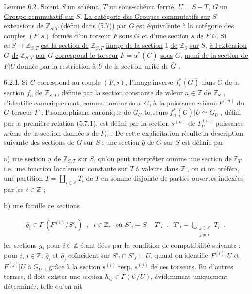 \underline{Lemme} 6.2. \underline{Soient} $S$ \underline{un schéma}, $T$ \underline{un sous-schéma fermé}, $U = S-T$, $G$ \underline{un Groupe commutatif sur} $S$. \underline{La catégorie des Groupes commutatifs sur} $S$ \underline{extensions de} $\mathbb{Z}_{S,T}$ (\underline{défini dans} (5.7)) \underline{par} $G$ \underline{est équivalente à la catégorie des couples} $(F,s)$ \underline{formés d'un torseur} $F$ \underline{sous} $G$ \underline{et d'une section} $s$ \underline{de} $F|U$. \underline{Si} $\alpha : S \longrightarrow \mathbb{Z}_{S,T}$ \underline{est la section de} $\mathbb{Z}_{S,T}$ \underline{image de la section} $1$ \underline{de} $\mathbb{Z}_S$ \underline{sur} $S$, \underline{à l'extension} $\overline{G}$ \underline{de} $\mathbb{Z}_{S,T}$ \underline{par} $G$ \underline{correspond le torseur} $F = \alpha^*(\overline{G})$ \underline{sous} $G$, \underline{muni de la section de} $F|U$ \underline{donnée par la restriction à} $U$ \underline{de la section unité de} $\overline{G}$ .



6.2.1. Si $\overline{G}$ correspond au couple $(F,s)$, l'image inverse $f^*_n(\overline{G})$ dans $\overline{G}$ de la section $f_n$ de $\mathbb{Z}_{S,T}$, définie par la section constante de valeur $n \in \mathbb{Z}$ de $\mathbb{Z}_S$ , s'identifie canoniquement, comme torseur sous $G$, à la puissance $n$.ième $F^{(n)}$ du $G$-torseur $F$ ; l'isomorphisme canonique de $G_U$-torseurs $f^*_n(\overline{G})|U \simeq G_U$ , défini par la première relation (5.7.1), est défini par la section $s^{(n)}$ de $F^{(n)}_U$ puissance $n$.ème de la section donnée $s$ de $F_U$ . De cette explicitation résulte la description suivante des sections de $\overline{G}$ sur $S$ : une section $\overline{g}$ de $\overline{G}$ sur $S$ est définie par

a) une section $\underline{n}$ de $\mathbb{Z}_{S,T}$ sur $S$, qu'on peut interpréter comme une section de $\mathbb{Z}_T$ i.e. une fonction localement constante sur $T$ à valeurs dans $\mathbb{Z}$ , ou si on préfère, une partition $T = \coprod\limits_{i \in \mathbb{Z}} T_i$ de $T$ en somme disjointe de parties ouvertes indexées par les $i \in \mathbb{Z}$ ;

b) une famille de sections

\begin{multline*}
\overline{g}_i \in \Gamma\,(F^{(i)}/S'_i) \;\;,\;\; i \in \mathbb{Z},\;\; \text{où } S'_i = S - T'_i \;\;,\;\; T'_i = \bigcup_{\substack{j \in \mathbb{Z} \\ j \neq i}} T_j \;\;,
\end{multline*}
les sections $\overline{g}_i$ pour $i \in \mathbb{Z}$ étant liées par la condition de compatibilité suivante : pour $i,j \in \mathbb{Z}$, $\overline{g}_i$ et $\overline{g}_j$ coïncident sur $S'_i \cap S'_j = U$, quand on identifie $F^{(i)}|U$ et $F^{(j)}|U$ à $G_U$ , grâce à la section $s^{(i)}$ resp. $s^{(j)}$ de ces torseurs. En d'autres termes, il doit exister une section $h_{ij} \in \Gamma(G/U)$, évidemment uniquement déterminée, telle qu'on ait

